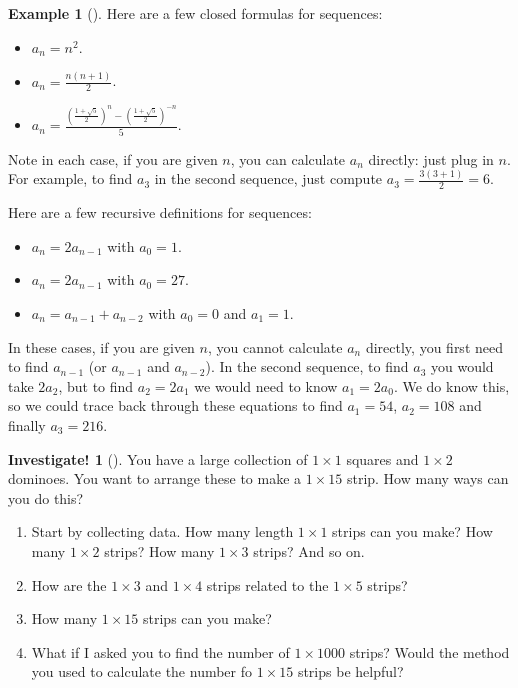 \documentclass[12pt,]{book}
\theoremstyle{plain}
\theoremstyle{definition}
\theoremstyle{definition}
\newtheorem{example}[theorem]{Example}
\theoremstyle{definition}
\newtheorem{investigation}[project]{Investigate!}
\numberwithin{equation}{chapter}
\renewcommand{\d}{\displaystyle}
\begin{document}
\begin{example}[]\label{example-2}
\hypertarget{p-42}{}%
Here are a few closed formulas for sequences: \leavevmode%
\begin{itemize}[label=\textbullet]
\item{}\(a_n = n^2\).%
\item{}\(\d a_n = \frac{n(n+1)}{2}\).%
\item{}\(\d a_n = \frac{\left(\frac{1 + \sqrt 5}{2}\right)^n - \left(\frac{1 + \sqrt 5}{2}\right)^{-n}}{5}\).%
\end{itemize}
%
\par
\hypertarget{p-43}{}%
Note in each case, if you are given \(n\), you can calculate \(a_n\) directly: just plug in \(n\).  For example, to find \(a_3\) in the second sequence, just compute \(a_3 = \frac{3(3+1)}{2} = 6\).%
\par
\hypertarget{p-44}{}%
Here are a few recursive definitions for sequences: \leavevmode%
\begin{itemize}[label=\textbullet]
\item{}\(a_n = 2a_{n-1}\) with \(a_0 = 1\).%
\item{}\(a_n = 2a_{n-1}\) with \(a_0 = 27\).%
\item{}\(a_n = a_{n-1} + a_{n-2}\) with \(a_0 = 0\) and \(a_1 = 1\).%
\end{itemize}
%
\par
\hypertarget{p-45}{}%
In these cases, if you are given \(n\), you cannot calculate \(a_n\) directly, you first need to find \(a_{n-1}\) (or \(a_{n-1}\) and \(a_{n-2}\)). In the second sequence, to find \(a_3\) you would take \(2a_2\), but to find \(a_2 = 2a_1\) we would need to know \(a_1 = 2a_0\).  We do know this, so we could trace back through these equations to find \(a_1 = 54\), \(a_2 = 108\) and finally \(a_3 = 216\).%
\end{example}
\begin{investigation}[]\label{investigation-3}
\hypertarget{p-46}{}%
You have a large collection of \(1\times 1\) squares and \(1\times 2\) dominoes. You want to arrange these to make a \(1 \times 15\) strip. How many ways can you do this? %
\begin{enumerate}
\item\hypertarget{li-30}{}\hypertarget{p-47}{}%
Start by collecting data. How many length \(1\times 1\) strips can you make? How many \(1\times 2\) strips? How many \(1\times 3\) strips? And so on.%
\item\hypertarget{li-31}{}\hypertarget{p-48}{}%
How are the \(1\times 3\) and \(1 \times 4\) strips related to the \(1\times 5\) strips?%
\item\hypertarget{li-32}{}\hypertarget{p-49}{}%
How many \(1\times 15\) strips can you make?%
\item\hypertarget{li-33}{}\hypertarget{p-50}{}%
What if I asked you to find the number of \(1\times 1000\) strips? Would the method you used to calculate the number fo \(1 \times 15\) strips be helpful?%
\end{enumerate}
%
\end{investigation}
\end{document}
